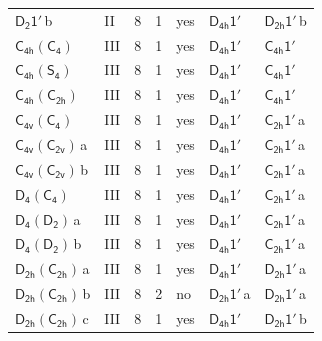 \documentclass[10pt,a4paper]{article}
\numberwithin{equation}{section}
\newcommand{\grp}[1]{\mathsf{#1}}
\newcommand{\clsletter}[1]{\,{\scriptsize\color{black!55}#1}}
\begin{document}
{\begin{longtable}{@{}llrrlll@{}}
\href{D2-1p.pdf}{$\grp{D_{2}1'}$}\clsletter{b} & II & 8 & 1 & yes & \href{D4h-1p.pdf}{$\grp{D_{4h}1'}$} & \href{D2h-1p.pdf}{$\grp{D_{2h}1'}$}\clsletter{b}\\
\href{C4h-C4.pdf}{$\grp{C_{4h}}(\grp{C_{4}})$} & III & 8 & 1 & yes & \href{D4h-1p.pdf}{$\grp{D_{4h}1'}$} & \href{C4h-1p.pdf}{$\grp{C_{4h}1'}$}\\
\href{C4h-S4.pdf}{$\grp{C_{4h}}(\grp{S_{4}})$} & III & 8 & 1 & yes & \href{D4h-1p.pdf}{$\grp{D_{4h}1'}$} & \href{C4h-1p.pdf}{$\grp{C_{4h}1'}$}\\
\href{C4h-C2h.pdf}{$\grp{C_{4h}}(\grp{C_{2h}})$} & III & 8 & 1 & yes & \href{D4h-1p.pdf}{$\grp{D_{4h}1'}$} & \href{C4h-1p.pdf}{$\grp{C_{4h}1'}$}\\
\href{C4v-C4.pdf}{$\grp{C_{4v}}(\grp{C_{4}})$} & III & 8 & 1 & yes & \href{D4h-1p.pdf}{$\grp{D_{4h}1'}$} & \href{C2h-1p.pdf}{$\grp{C_{2h}1'}$}\clsletter{a}\\
\href{C4v-C2v.pdf}{$\grp{C_{4v}}(\grp{C_{2v}})$}\clsletter{a} & III & 8 & 1 & yes & \href{D4h-1p.pdf}{$\grp{D_{4h}1'}$} & \href{C2h-1p.pdf}{$\grp{C_{2h}1'}$}\clsletter{a}\\
\href{C4v-C2v.pdf}{$\grp{C_{4v}}(\grp{C_{2v}})$}\clsletter{b} & III & 8 & 1 & yes & \href{D4h-1p.pdf}{$\grp{D_{4h}1'}$} & \href{C2h-1p.pdf}{$\grp{C_{2h}1'}$}\clsletter{a}\\
\href{D4-C4.pdf}{$\grp{D_{4}}(\grp{C_{4}})$} & III & 8 & 1 & yes & \href{D4h-1p.pdf}{$\grp{D_{4h}1'}$} & \href{C2h-1p.pdf}{$\grp{C_{2h}1'}$}\clsletter{a}\\
\href{D4-D2.pdf}{$\grp{D_{4}}(\grp{D_{2}})$}\clsletter{a} & III & 8 & 1 & yes & \href{D4h-1p.pdf}{$\grp{D_{4h}1'}$} & \href{C2h-1p.pdf}{$\grp{C_{2h}1'}$}\clsletter{a}\\
\href{D4-D2.pdf}{$\grp{D_{4}}(\grp{D_{2}})$}\clsletter{b} & III & 8 & 1 & yes & \href{D4h-1p.pdf}{$\grp{D_{4h}1'}$} & \href{C2h-1p.pdf}{$\grp{C_{2h}1'}$}\clsletter{a}\\
\href{D2h-C2h.pdf}{$\grp{D_{2h}}(\grp{C_{2h}})$}\clsletter{a} & III & 8 & 1 & yes & \href{D4h-1p.pdf}{$\grp{D_{4h}1'}$} & \href{D2h-1p.pdf}{$\grp{D_{2h}1'}$}\clsletter{a}\\
\href{D2h-C2h.pdf}{$\grp{D_{2h}}(\grp{C_{2h}})$}\clsletter{b} & III & 8 & 2 & no & \href{D2h-1p.pdf}{$\grp{D_{2h}1'}$}\clsletter{a} & \href{D2h-1p.pdf}{$\grp{D_{2h}1'}$}\clsletter{a}\\
\href{D2h-C2h.pdf}{$\grp{D_{2h}}(\grp{C_{2h}})$}\clsletter{c} & III & 8 & 1 & yes & \href{D4h-1p.pdf}{$\grp{D_{4h}1'}$} & \href{D2h-1p.pdf}{$\grp{D_{2h}1'}$}\clsletter{b}\\

\end{longtable}}
\end{document}
